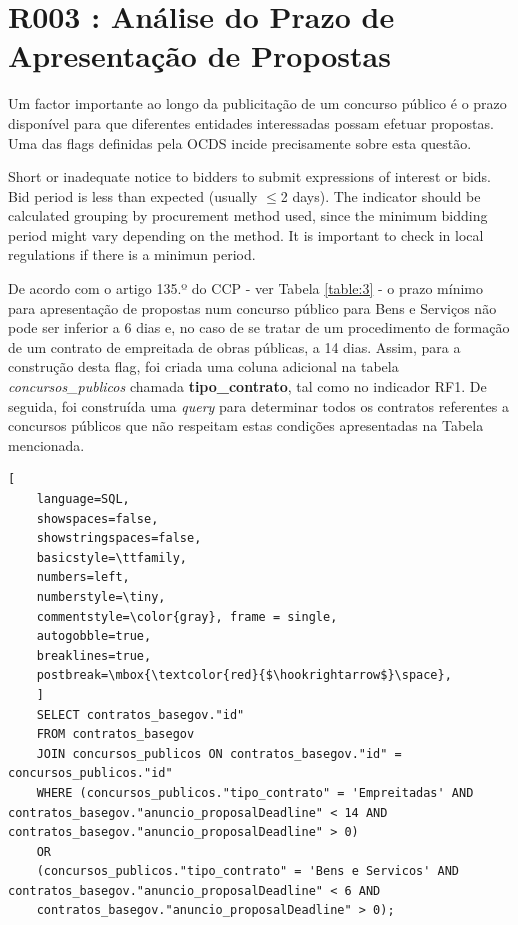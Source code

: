 \section{R003 : Análise do Prazo de Apresentação de Propostas}

Um factor importante ao longo da publicitação de um concurso público é o prazo disponível para que diferentes entidades interessadas possam efetuar propostas. Uma das flags definidas pela OCDS incide precisamente sobre esta questão.

\Lemma{}
{Short or inadequate notice to bidders to submit expressions of interest or bids. Bid period is less than expected (usually $\leq$2 days). The indicator should be calculated grouping by procurement method used, since the minimum bidding period might vary depending on the method.  It is important to check in local regulations if there is a minimun period.}


De acordo com o artigo 135.º do CCP - ver Tabela \ref{table:3} - o prazo mínimo para apresentação de propostas num concurso público para Bens e Serviços não pode ser inferior a 6 dias e, no caso de se tratar de um procedimento de formação de um contrato de empreitada de obras públicas, a 14 dias. Assim, para a construção desta flag, foi criada uma coluna adicional na tabela \textit{concursos\_publicos} chamada \textbf{tipo\_contrato}, tal como no indicador RF1. De seguida, foi construída uma \textit{query} para determinar todos os contratos referentes a concursos públicos que não respeitam estas condições apresentadas na Tabela mencionada. \\


\begin{lstlisting}[
	language=SQL,
	showspaces=false,
	showstringspaces=false,
	basicstyle=\ttfamily,
	numbers=left,
	numberstyle=\tiny,
	commentstyle=\color{gray}, frame = single,
	autogobble=true,
	breaklines=true,
	postbreak=\mbox{\textcolor{red}{$\hookrightarrow$}\space},
	]
	SELECT contratos_basegov."id" 
	FROM contratos_basegov
	JOIN concursos_publicos ON contratos_basegov."id" = concursos_publicos."id"
	WHERE (concursos_publicos."tipo_contrato" = 'Empreitadas' AND contratos_basegov."anuncio_proposalDeadline" < 14 AND contratos_basegov."anuncio_proposalDeadline" > 0) 
	OR
	(concursos_publicos."tipo_contrato" = 'Bens e Servicos' AND contratos_basegov."anuncio_proposalDeadline" < 6 AND
	contratos_basegov."anuncio_proposalDeadline" > 0);
	
\end{lstlisting}


